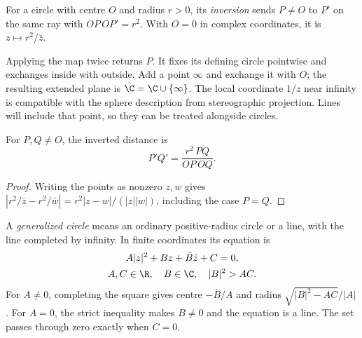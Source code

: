 \begin{definition}\label{geometry:def:inversion}
For a circle with centre $O$ and radius $r>0$, its \emph{inversion} sends $P\ne O$ to $P'$ on the same ray with $OP\,OP'=r^2$. With $O=0$ in complex coordinates, it is $z\mapsto r^2/\bar z$.
\end{definition}

Applying the map twice returns $P$. It fixes its defining circle pointwise and exchanges inside with outside. Add a point $\infty$ and exchange it with $O$; the resulting extended plane is $\hat{\C}=\C\cup\{\infty\}$. The local coordinate $1/z$ near infinity is compatible with the sphere description from stereographic projection. Lines will include that point, so they can be treated alongside circles.

\begin{proposition}[distances]\label{geometry:prop:invdist}
For $P,Q\ne O$, the inverted distance is
\[
P'Q'=\frac{r^2\,PQ}{OP\,OQ}.
\]
\end{proposition}
\begin{proof}
Writing the points as nonzero $z,w$ gives
$|r^2/\bar z-r^2/\bar w|=r^2|z-w|/(|z||w|)$, including the case $P=Q$.
\end{proof}

A \emph{generalized circle} means an ordinary positive-radius circle or a line, with the line completed by infinity. In finite coordinates its equation is
\begin{equation}\label{geometry:eq:gencircle}
\begin{gathered}
A|z|^2+Bz+\bar B\bar z+C=0,\\
A,C\in\R,\quad B\in\C,\quad |B|^2>AC.
\end{gathered}
\end{equation}
For $A\ne0$, completing the square gives centre $-\bar B/A$ and radius $\sqrt{|B|^2-AC}/|A|$. For $A=0$, the strict inequality makes $B\ne0$ and the equation is a line. The set passes through zero exactly when $C=0$.

